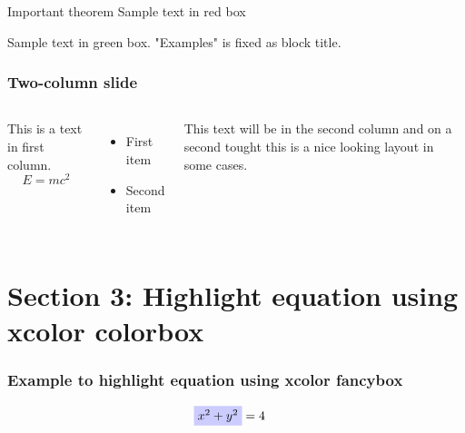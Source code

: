 \documentclass{beamer}
\begin{document}
\begin{frame}
  \begin{alertblock}{Important theorem}
    Sample text in red box
  \end{alertblock}

  \begin{examples}
    Sample text in green box. "Examples" is fixed as block title.
  \end{examples}
\end{frame}


\begin{frame}
\frametitle{Two-column slide}
    \begin{columns}
      This is a text in first column.
      $$E=mc^2$$

    \begin{itemize}
      \item First item
      \item Second item
    \end{itemize}

    This text will be in the second column
    and on a second tought this is a nice looking
    layout in some cases.
  \end{columns}
\end{frame}


%
%
%
%
\section{Section 3: Highlight equation using xcolor colorbox}\label{sec:sec3}
\begin{frame}
  \frametitle{Example to highlight equation using xcolor fancybox}


    \begin{align}\label{eq:eq1}
       \colorbox{blue!20}{$ x^2 + y^2$} &= 4
    \end{align}

\end{frame}
\end{document}
